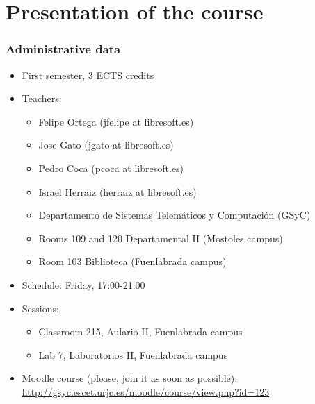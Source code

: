 

\section{Presentation of the course}


\begin{frame}
\frametitle{Administrative data}

\begin{itemize}
\item First semester, 3 ECTS credits
\item Teachers:
  \begin{itemize}
  \item Felipe Ortega (jfelipe at libresoft.es)
  \item Jose Gato (jgato at libresoft.es)
  \item Pedro Coca (pcoca at libresoft.es)
  \item Israel Herraiz (herraiz at libresoft.es)
  \item Departamento de Sistemas Telemáticos y Computación (GSyC)
  \item Rooms 109 and 120 Departamental II (Mostoles campus)
  \item Room 103 Biblioteca (Fuenlabrada campus)
  \end{itemize}
\item Schedule: Friday, 17:00-21:00
\item Sessions:
  \begin{itemize}
  \item Classroom 215, Aulario II, Fuenlabrada campus
  \item Lab 7, Laboratorios II, Fuenlabrada campus
  \end{itemize}
\item Moodle course (please, join it as soon as possible): \\
  \url{http://gsyc.escet.urjc.es/moodle/course/view.php?id=123}
\end{itemize}
\end{frame}


